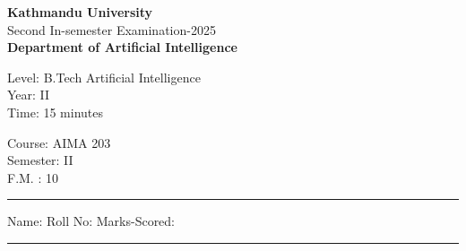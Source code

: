 \documentclass[12pt]{exam}
\begin{document}
\begin{center}
  {\bfseries  {\large Kathmandu University}} \\
  Second In-semester Examination-2025 \\[-2mm]
    \textbf{\small Department of Artificial Intelligence}
\end{center}
\vspace{2mm}

\begin{minipage}{0.70\linewidth}
  \begin{flushleft}
    Level: B.Tech Artificial Intelligence \\
    Year: II \\
    Time: 15 minutes
  \end{flushleft}
\end{minipage} \hfill
\begin{minipage}{0.25\linewidth}
  \begin{flushleft}
    Course: AIMA 203 \\
    Semester: II \\
    F.M. : 10
  \end{flushleft}
\end{minipage}
\vspace{-8mm}
\begin{center}
  \rule{\textwidth}{1pt}
  Name: \hspace{5cm}  Roll No: \hspace{3cm} Marks-Scored:
  \vskip -3mm
\rule{\textwidth}{1pt}
\end{center}
\end{document}
